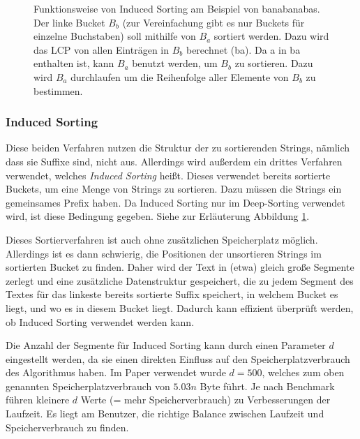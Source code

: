 \begin{figure}
\caption[Funktionsweise von Induced Sorting]{Funktionsweise von Induced Sorting am Beispiel von \glqq banabanabas\grqq. Der linke Bucket $B_b$ (zur Vereinfachung gibt es nur Buckets für einzelne Buchstaben) soll mithilfe von $B_a$ sortiert werden. Dazu wird das LCP von allen Einträgen in $B_b$ berechnet (\glqq ba\grqq). Da \glqq a\grqq{} in \glqq ba\grqq{} enthalten ist, kann $B_a$ benutzt werden, um $B_b$ zu sortieren. Dazu wird $B_a$ durchlaufen um die Reihenfolge aller Elemente von $B_b$ zu bestimmen.}
\label{fg:induced}
\end{figure}

\subsubsection{Induced Sorting}

Diese beiden Verfahren nutzen die Struktur der zu sortierenden Strings, nämlich dass sie Suffixe sind, nicht aus.
Allerdings wird außerdem ein drittes Verfahren verwendet, welches \textit{Induced Sorting} heißt.
Dieses verwendet bereits sortierte Buckets, um eine Menge von Strings zu sortieren.
Dazu müssen die Strings ein gemeinsames Prefix haben.
Da Induced Sorting nur im Deep-Sorting verwendet wird, ist diese Bedingung gegeben.
Siehe zur Erläuterung Abbildung \ref{fg:induced}.

Dieses Sortierverfahren ist auch ohne zusätzlichen Speicherplatz möglich.
Allerdings ist es dann schwierig, die Positionen der unsortieren Strings im sortierten Bucket zu finden.
Daher wird der Text in (etwa) gleich große Segmente zerlegt und eine zusätzliche Datenstruktur gespeichert, die zu jedem Segment des Textes für das linkeste bereits sortierte Suffix speichert, in welchem Bucket es liegt, und wo es in diesem Bucket liegt.
Dadurch kann effizient überprüft werden, ob Induced Sorting verwendet werden kann.

Die Anzahl der Segmente für Induced Sorting kann durch einen Parameter $d$ eingestellt werden, da sie einen direkten Einfluss auf den Speicherplatzverbrauch des Algorithmus haben.
Im Paper verwendet wurde $d = 500$, welches zum oben genannten Speicherplatzverbrauch von $5.03n$ Byte führt.
Je nach Benchmark führen kleinere $d$ Werte (= mehr Speicherverbrauch) zu Verbesserungen der Laufzeit.
Es liegt am Benutzer, die richtige Balance zwischen Laufzeit und Speicherverbrauch zu finden.

